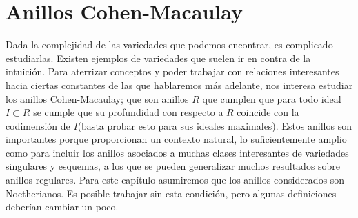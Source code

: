 \chapter{Anillos Cohen-Macaulay}

Dada la complejidad de las variedades que podemos encontrar, es complicado estudiarlas. Existen ejemplos de variedades que suelen ir en contra de la intuición. Para aterrizar conceptos y poder trabajar con relaciones interesantes hacia ciertas constantes de las que hablaremos más adelante, nos interesa estudiar los anillos Cohen-Macaulay; que son anillos $R$ que cumplen que para todo ideal $I \subset R$ se cumple que su profundidad con respecto a $R$ coincide con la codimensión de $I$(basta probar esto para sus ideales maximales). Estos anillos son importantes porque proporcionan un contexto natural, lo suficientemente amplio como para incluir los anillos asociados a muchas clases interesantes de variedades singulares y esquemas, a los que se pueden generalizar muchos resultados sobre anillos regulares. Para este capítulo asumiremos que los anillos considerados son Noetherianos. Es posible trabajar sin esta condición, pero algunas definiciones deberían cambiar un poco.



